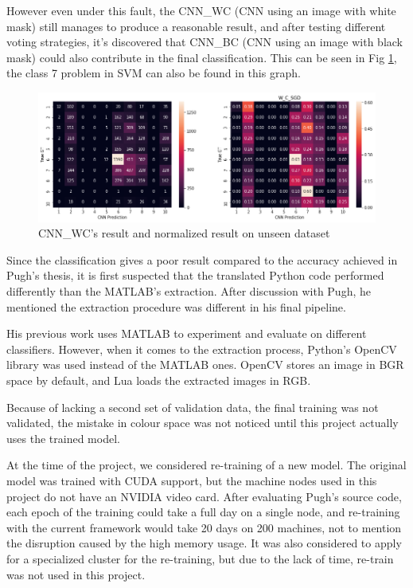 \documentclass[bsc,logo,twoside,fullspacing,parskip]{infthesis}
\begin{document}
However even under this fault, the CNN\_WC (CNN using an image with white mask) still manages to produce a reasonable result, and after testing different voting strategies, it's discovered that CNN\_BC (CNN using an image with black mask) could also contribute in the final classification.
This can be seen in Fig \ref{fig:cnnbcacc}, the class 7 problem in SVM can also be found in this graph.

\begin{figure}[h]
\centering
    \includegraphics[scale=0.44]{graph/cnnwc.png}
    \caption{CNN\_WC's result and normalized result on unseen dataset}
    \label{fig:cnnbcacc}
\end{figure} 

Since the classification gives a poor result compared to the accuracy achieved in Pugh's thesis\cite{Pugh}, it is first suspected that the translated Python code performed differently than the MATLAB's extraction.
After discussion with Pugh, he mentioned the extraction procedure was different in his final pipeline.

His previous work uses MATLAB to experiment and evaluate on different classifiers.
However, when it comes to the extraction process, Python's OpenCV library was used instead of the MATLAB ones.
OpenCV stores an image in BGR space by default, and Lua loads the extracted images in RGB.

Because of lacking a second set of validation data, the final training was not validated, the mistake in colour space was not noticed until this project actually uses the trained model.

At the time of the project, we considered re-training of a new model. 
The original model was trained with CUDA support, but the machine nodes used in this project do not have an NVIDIA video card. 
After evaluating Pugh's source code, each epoch of the training could take a full day on a single node, and re-training with the current framework would take 20 days on 200 machines, not to mention the disruption caused by the high memory usage. 
It was also considered to apply for a specialized cluster for the re-training, but due to the lack of time, re-train was not used in this project.
\end{document}
